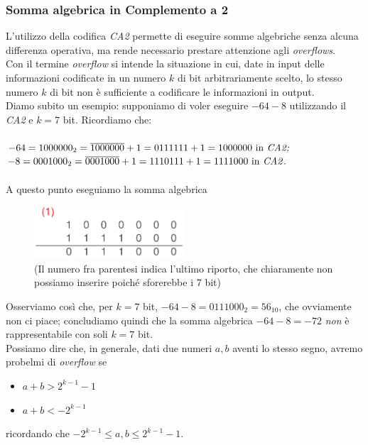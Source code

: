 \subsubsection{Somma algebrica in Complemento a 2} L'utilizzo della codifica \textit{CA2} permette di eseguire somme algebriche senza alcuna differenza operativa, ma rende necessario prestare attenzione agli \textit{overflows}.\\
Con il termine \textit{overflow} si intende la situazione in cui, date in input delle informazioni codificate in un numero $k$ di bit arbitrariamente scelto, lo stesso numero $k$ di bit non è sufficiente a codificare le informazioni in output. \\
Diamo subito un esempio: supponiamo di voler eseguire $-64-8$ utilizzando il \textit{CA2} e $k=7$ bit. Ricordiamo che:\\\\
$-64=1000000_{2}=\overline{1000000}+1=0111111+1=1000000 \text{ in \textit{CA2;}}$\\
$-8=0001000_{2}=\overline{0001000}+1=1110111+1=1111000 \text{ in \textit{CA2}}.$\\\\
A questo punto eseguiamo la somma algebrica
\begin{figure}[H]
	\centering
	\includegraphics[width=0.5\textwidth,keepaspectratio]{images/overflow.png}
	\caption{(Il numero fra parentesi indica l'ultimo riporto, che chiaramente non possiamo inserire poiché sforerebbe i 7 bit)}
\end{figure}
Osserviamo così che, per $k=7$ bit, $-64-8=0111000_{2}=56_{10}$, che ovviamente non ci piace; concludiamo quindi che la somma algebrica $-64-8=-72$ \textit{non} è rappresentabile con soli $k=7$ bit.\\

Possiamo dire che, in generale, dati due numeri $a, b$ aventi lo stesso segno, avremo probelmi di \textit{overflow} se 
\begin{itemize}[noitemsep,nolistsep]
	\item $a+b>2^{k-1}-1$
	\item $a+b<-2^{k-1}$
\end{itemize}
ricordando che $-2^{k-1}\le a,b\le 2^{k-1}-1$.

